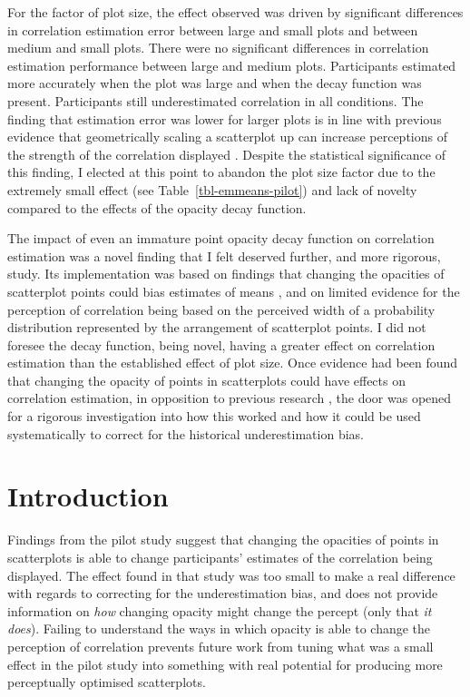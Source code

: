 \documentclass[../main.tex]{subfiles}
\begin{document}
For the factor of plot size, the effect observed was driven by
significant differences in correlation estimation error between large
and small plots and between medium and small plots. There were no
significant differences in correlation estimation performance between
large and medium plots. Participants estimated more accurately when the
plot was large and when the decay function was present. Participants
still underestimated correlation in all conditions. The finding that
estimation error was lower for larger plots is in line with previous
evidence that geometrically scaling a scatterplot up can increase
perceptions of the strength of the correlation displayed
\cite{wei_2020}. Despite the statistical significance of this finding, I
elected at this point to abandon the plot size factor due to the
extremely small effect (see Table~\ref{tbl-emmeans-pilot}) and lack of
novelty compared to the effects of the opacity decay function.

The impact of even an immature point opacity decay function on
correlation estimation was a novel finding that I felt deserved further,
and more rigorous, study. Its implementation was based on findings that
changing the opacities of scatterplot points could bias estimates of
means \cite{hong_2022}, and on limited evidence for the perception of
correlation being based on the perceived width of a probability
distribution represented by the arrangement of scatterplot points. I did
not foresee the decay function, being novel, having a greater effect on
correlation estimation than the established effect of plot size. Once
evidence had been found that changing the opacity of points in
scatterplots could have effects on correlation estimation, in opposition
to previous research \cite{rensink_2012, rensink_2014}, the door was
opened for a rigorous investigation into how this worked and how it
could be used systematically to correct for the historical
underestimation bias.

\section{Introduction}\label{introduction-adjusting-opacity}

Findings from the pilot study suggest that changing the opacities of
points in scatterplots is able to change participants' estimates of the
correlation being displayed. The effect found in that study was too
small to make a real difference with regards to correcting for the
underestimation bias, and does not provide information on \emph{how}
changing opacity might change the percept (only that \emph{it does}).
Failing to understand the ways in which opacity is able to change the
perception of correlation prevents future work from tuning what was a
small effect in the pilot study into something with real potential for
producing more perceptually optimised scatterplots.
\end{document}
